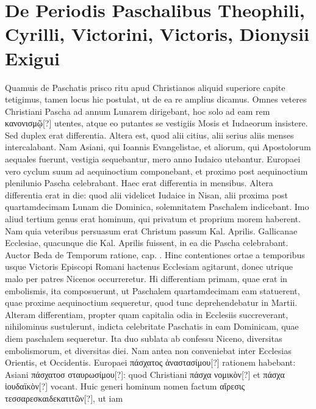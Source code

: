 \section{De Periodis Paschalibus Theophili, Cyrilli, Victorini, Victoris,
 Dionysii Exigui}
%
Quamuis de Paschatis prisco ritu apud Christianos aliquid superiore
capite tetigimus, tamen locus hic postulat, ut de ea re
amplius dicamus.
Omnes veteres Christiani Pascha ad annum
Lunarem dirigebant, hoc solo ad eam rem \textgreek{κανονισμῷ[?]} utentes,
atque eo putantes se vestigiis Mosis et Iudaeorum insistere.
Sed duplex erat differentia.
Altera est, quod alii citius, alii serius aliis menses
intercalabant.
Nam Asiani, qui Ioannis Evangelistae, et aliorum,
qui Apostolorum aequales fuerunt, vestigia sequebantur, mero anno
Iudaico utebantur.
Europaei vero cyclum suum ad aequinoctium
componebant, et proximo post aequinoctium plenilunio Pascha celebrabant.
Haec erat differentia in mensibus.
Altera differentia erat in
die: quod alii videlicet Iudaice in  Nisan, alii proxima post
quartamdecimam Lunam die Dominica, solemnitatem Paschalem
indicebant.
Imo aliud tertium genus erat hominum, qui privatum
et proprium morem haberent.
Nam quia veteribus persuasum erat
Christum passum  Kal. Aprilis.
%
Gallicanae Ecclesiae, quacunque die
 Kal. Aprilis fuissent, in ea die Pascha celebrabant.
Auctor Beda
de Temporum ratione, cap. . %
Hinc contentiones ortae a temporibus
usque Victoris Episcopi Romani hactenus Ecclesiam agitarunt,
donec utrique malo per patres Nicenos occurreretur.
Hi differentiam
primam, quae erat in embolismis, ita composuerunt, ut Paschalem
quartamdecimam eam statuerent, quae proxime aequinoctium
sequeretur, quod tunc deprehendebatur in  Martii.
Alteram
differentiam, propter quam capitalia odia in Ecclesiis succreverant,
nihilominus sustulerunt, indicta celebritate Paschatis in eam Dominicam,
quae  diem paschalem sequeretur.
Ita duo sublata ab %
 confessu
Niceno, diversitas embolismorum, et diversitas diei.
Nam antea
non conveniebat inter Ecclesias Orientis, et Occidentis.
Europaei
\textgreek{πάσχατος ἀναστασίμου[?]} rationem habebant:
 Asiani \textgreek{πάσχατοσ σταυρωσίμου[?]}:
quod Christiani \textgreek{πάσχα νομικὸν[?]} et
 \textgreek{πάσχα ἰουδαϊκὸν[?]} vocant.
Huic
generi hominum nomen factum \textgreek{αἵρεσις τεσσαρεσκαιδεκατιτῶν[?]}, ut iam
